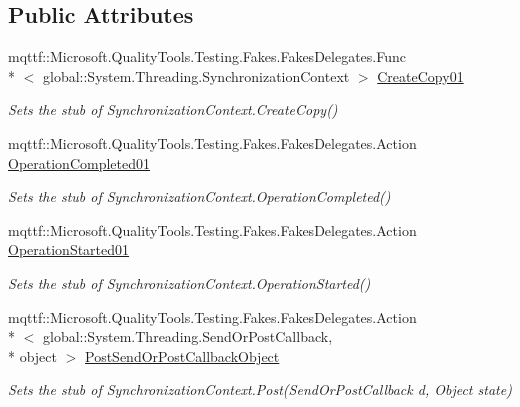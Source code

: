 \subsection*{Public Attributes}
\begin{DoxyCompactItemize}
\item 
mqttf\-::\-Microsoft.\-Quality\-Tools.\-Testing.\-Fakes.\-Fakes\-Delegates.\-Func\\*
$<$ global\-::\-System.\-Threading.\-Synchronization\-Context $>$ \hyperlink{class_system_1_1_threading_1_1_fakes_1_1_stub_synchronization_context_ad58fd15d1d741550a78a0e4a4b80cd2a}{Create\-Copy01}
\begin{DoxyCompactList}\small\item\em Sets the stub of Synchronization\-Context.\-Create\-Copy()\end{DoxyCompactList}\item 
mqttf\-::\-Microsoft.\-Quality\-Tools.\-Testing.\-Fakes.\-Fakes\-Delegates.\-Action \hyperlink{class_system_1_1_threading_1_1_fakes_1_1_stub_synchronization_context_aa7cd021d4963e4c33ccf2df6539a042c}{Operation\-Completed01}
\begin{DoxyCompactList}\small\item\em Sets the stub of Synchronization\-Context.\-Operation\-Completed()\end{DoxyCompactList}\item 
mqttf\-::\-Microsoft.\-Quality\-Tools.\-Testing.\-Fakes.\-Fakes\-Delegates.\-Action \hyperlink{class_system_1_1_threading_1_1_fakes_1_1_stub_synchronization_context_af4673be9174afd1404066f518b00e20c}{Operation\-Started01}
\begin{DoxyCompactList}\small\item\em Sets the stub of Synchronization\-Context.\-Operation\-Started()\end{DoxyCompactList}\item 
mqttf\-::\-Microsoft.\-Quality\-Tools.\-Testing.\-Fakes.\-Fakes\-Delegates.\-Action\\*
$<$ global\-::\-System.\-Threading.\-Send\-Or\-Post\-Callback, \\*
object $>$ \hyperlink{class_system_1_1_threading_1_1_fakes_1_1_stub_synchronization_context_a12a3114b6840566e9c49db563f0a2a56}{Post\-Send\-Or\-Post\-Callback\-Object}
\begin{DoxyCompactList}\small\item\em Sets the stub of Synchronization\-Context.\-Post(\-Send\-Or\-Post\-Callback d, Object state)\end{DoxyCompactList}\item 

\end{DoxyCompactItemize}
